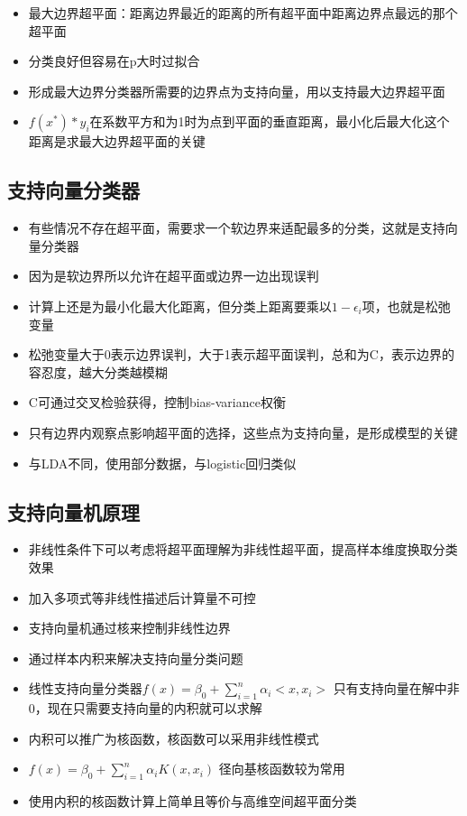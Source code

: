 \documentclass[]{book}
\providecommand{\tightlist}{%
  \setlength{\itemsep}{0pt}\setlength{\parskip}{0pt}}
\begin{document}
\begin{itemize}
\tightlist
\item
  最大边界超平面：距离边界最近的距离的所有超平面中距离边界点最远的那个超平面
\item
  分类良好但容易在p大时过拟合
\item
  形成最大边界分类器所需要的边界点为支持向量，用以支持最大边界超平面
\item
  \(f(x^*)*y_i\)在系数平方和为1时为点到平面的垂直距离，最小化后最大化这个距离是求最大边界超平面的关键
\end{itemize}

\hypertarget{ux652fux6301ux5411ux91cfux5206ux7c7bux5668}{%
\subsection{支持向量分类器}\label{ux652fux6301ux5411ux91cfux5206ux7c7bux5668}}

\begin{itemize}
\tightlist
\item
  有些情况不存在超平面，需要求一个软边界来适配最多的分类，这就是支持向量分类器
\item
  因为是软边界所以允许在超平面或边界一边出现误判
\item
  计算上还是为最小化最大化距离，但分类上距离要乘以\(1 - \epsilon_i\)项，也就是松弛变量
\item
  松弛变量大于0表示边界误判，大于1表示超平面误判，总和为C，表示边界的容忍度，越大分类越模糊
\item
  C可通过交叉检验获得，控制bias-variance权衡
\item
  只有边界内观察点影响超平面的选择，这些点为支持向量，是形成模型的关键
\item
  与LDA不同，使用部分数据，与logistic回归类似
\end{itemize}

\hypertarget{ux652fux6301ux5411ux91cfux673aux539fux7406}{%
\subsection{支持向量机原理}\label{ux652fux6301ux5411ux91cfux673aux539fux7406}}

\begin{itemize}
\tightlist
\item
  非线性条件下可以考虑将超平面理解为非线性超平面，提高样本维度换取分类效果
\item
  加入多项式等非线性描述后计算量不可控
\item
  支持向量机通过核来控制非线性边界
\item
  通过样本内积来解决支持向量分类问题
\item
  线性支持向量分类器\(f(x) = \beta_0 + \sum_{i = 1}^{n} \alpha_i < x,x_i >\) 只有支持向量在解中非0，现在只需要支持向量的内积就可以求解
\item
  内积可以推广为核函数，核函数可以采用非线性模式
\item
  \(f(x) = \beta_0 + \sum_{i = 1}^{n} \alpha_i K( x,x_i )\) 径向基核函数较为常用
\item
  使用内积的核函数计算上简单且等价与高维空间超平面分类
\end{itemize}
\end{document}
